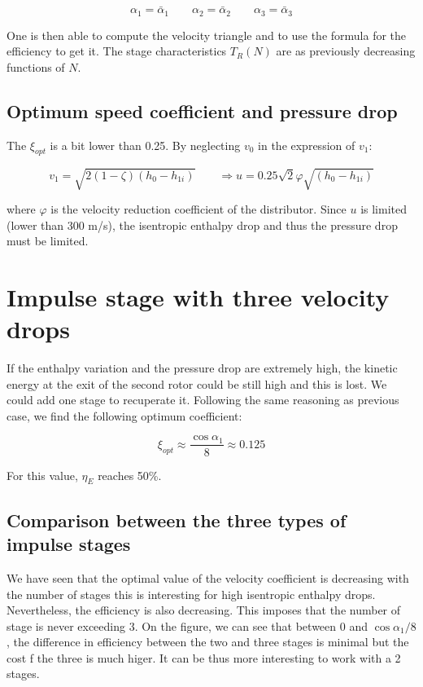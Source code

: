 \begin{equation}
\alpha _1= \bar{\alpha} _1 \qquad \alpha _2= \bar{\alpha} _2 \qquad \alpha _3= \bar{\alpha} _3
\end{equation}

One is then able to compute the velocity triangle and to use the formula for the efficiency to get it. The stage characteristics $T_R(N)$ are as previously decreasing functions of $N$. 

\subsection{Optimum speed coefficient and pressure drop}
The $\xi _{opt}$ is a bit lower than 0.25. By neglecting $v_0$ in the expression of $v_1$: 

\begin{equation}
v_1 = \sqrt{2(1- \zeta)(h_{0}-h_{1i})}\qquad \Rightarrow u = 0.25 \sqrt{2}\varphi \sqrt{(h_0 - h_{1i})}
\end{equation}

where $\varphi$ is the velocity reduction coefficient of the distributor. Since $u$ is limited (lower than 300 m/s), the isentropic enthalpy drop and thus the pressure drop must be limited. 

\section{Impulse stage with three velocity drops}
If the enthalpy variation and the pressure drop are extremely high, the kinetic energy at the exit of the second rotor could be still high and this is lost. We could add one stage to recuperate it. Following the same reasoning as previous case, we find the following optimum coefficient: 

\begin{equation}
\xi _{opt} \approx \frac{\cos \alpha _1}{8} \approx 0.125
\end{equation}

For this value, $\eta _E$ reaches 50\%. 

\subsection{Comparison between the three types of impulse stages}
We have seen that the optimal value of the velocity coefficient is decreasing with the number of stages this is interesting for high isentropic enthalpy drops. Nevertheless, the efficiency is also decreasing. This imposes that the number of stage is never exceeding 3. On the figure, we can see that between 0 and $\cos \alpha _1 / 8$, the difference in efficiency between the two and three stages is minimal but the cost f the three is much higer. It can be thus more interesting to work with a 2 stages. 

